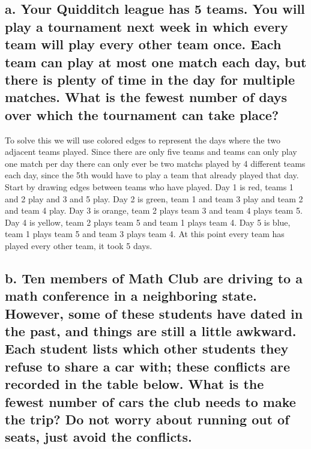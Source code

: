 \documentclass{article}
\begin{document}
\subsection*{a. Your Quidditch league has 5 teams. You will play a tournament next week in which every team will play every other team once. Each team can play at most one match each day, but there is plenty of time in the day for multiple matches. What is the fewest number of days over which the tournament can take place?}
To solve this we will use colored edges to represent the days where the two adjacent teams played. Since there are only five teams and teams can only play one match per day there can only ever be two matchs played by 4 different teams each day, since the 5th would have to play a team that already played that day. Start by drawing edges between teams who have played. Day 1 is red, teams 1 and 2 play and 3 and 5 play. Day 2 is green, team 1 and team 3 play and team 2 and team 4 play. Day 3 is orange, team 2 plays team 3 and team 4 plays team 5. Day 4 is yellow, team 2 plays team 5 and team 1 plays team 4. Day 5 is blue, team 1 plays team 5 and team 3 plays team 4. At this point every team has played every other team, it took 5 days. 
\begin{center}
\end{center}

\subsection*{b. Ten members of Math Club are driving to a math conference in a neighboring state. However, some of these students have dated in the past, and things are still a little awkward. Each student lists which other students they refuse to share a car with; these conflicts are recorded in the table below. What is the fewest number of cars the club needs to make the trip? Do not worry about running out of seats, just avoid the conflicts.}
\end{document}

